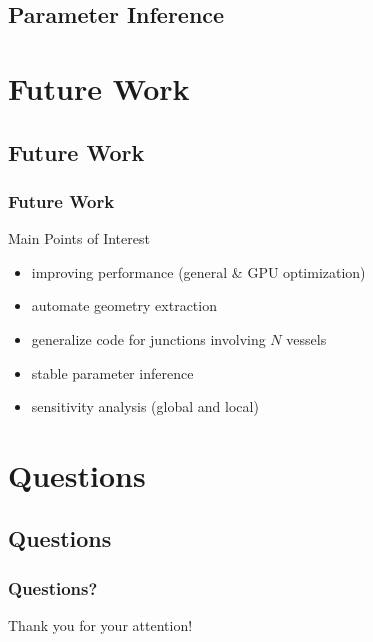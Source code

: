 \documentclass[compress]{beamer}
\begin{document}
\subsection{Parameter Inference}

\begin{frame}

\end{frame}


\section{Future Work}
\subsection{Future Work}
\begin{frame}
	\frametitle{Future Work}
	\begin{block}{Main Points of Interest}
		\begin{itemize}
			\item<1-> improving performance (general \& GPU optimization)
			\item<2-> automate geometry extraction
			\item<3-> generalize code for junctions involving $N$ vessels
			\item<4-> stable parameter inference
			\item<5-> sensitivity analysis (global and local)
		\end{itemize}
	\end{block}
	\vspace{5mm}
\end{frame}


\section{Questions}
\subsection{Questions}
\begin{frame}
	\frametitle{Questions?}
	Thank you for your attention!
\end{frame}
\end{document}
